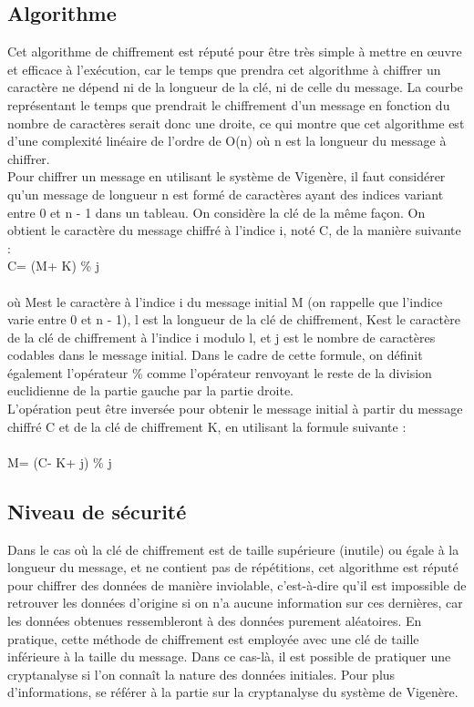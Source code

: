 		\subsection{Algorithme}
			Cet algorithme de chiffrement est réputé pour être très simple à mettre en \oe{uvre} et efficace à l'exécution, car le temps que prendra cet algorithme à chiffrer un caractère ne dépend ni de la longueur de la clé, ni de celle du message. La courbe représentant le temps que prendrait le chiffrement d'un message en fonction du nombre de caractères serait donc une droite, ce qui montre que cet algorithme est d'une complexité linéaire de l'ordre de O(n) où n est la longueur du message à chiffrer.\\
			Pour chiffrer un message en utilisant le système de Vigenère, il faut considérer qu'un message de longueur n est formé de caractères ayant des indices variant entre 0 et n - 1 dans un tableau. On considère la clé de la même façon. On obtient le caractère du message chiffré à l'indice i, noté C\rbrack, de la manière suivante :\linebreak
			\\
			C\rbrack = (M\rbrack + K\rbrack) \% j\\
			\\
			où M\rbrack est le caractère à l'indice i du message initial M (on rappelle que l'indice varie entre 0 et n - 1), l est la longueur de la clé de chiffrement, K\rbrack est le caractère de la clé de chiffrement à l'indice i modulo l, et j est le nombre de caractères codables dans le message initial. Dans le cadre de cette formule, on définit également l'opérateur \% comme l'opérateur renvoyant le reste de la division euclidienne de la partie gauche par la partie droite.\\
			L'opération peut être inversée pour obtenir le message initial à partir du message chiffré C et de la clé de chiffrement K, en utilisant la formule suivante :\\
			\\
			M\rbrack = (C\rbrack - K\rbrack + j) \% j
		\subsection{Niveau de sécurité}
			Dans le cas où la clé de chiffrement est de taille supérieure (inutile) ou égale à la longueur du message, et ne contient pas de répétitions, cet algorithme est réputé pour chiffrer des données de manière inviolable, c'est-à-dire qu'il est impossible de retrouver les données d'origine si on n'a aucune information sur ces dernières, car les données obtenues ressembleront à des données purement aléatoires. En pratique, cette méthode de chiffrement est employée avec une clé de taille inférieure à la taille du message. Dans ce cas-là, il est possible de pratiquer une cryptanalyse si l'on connaît la nature des données initiales. Pour plus d'informations, se référer à la partie sur la cryptanalyse du système de Vigenère.
